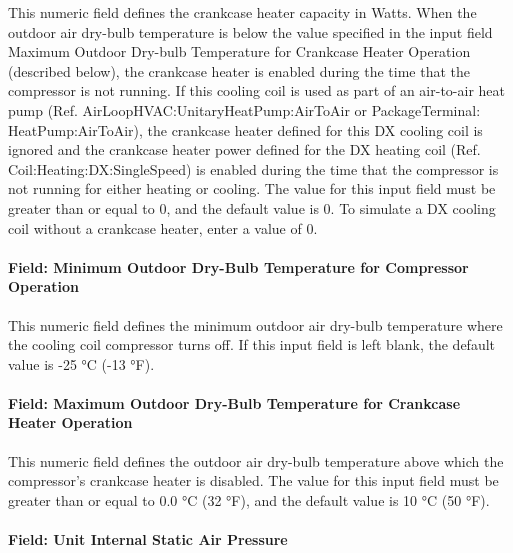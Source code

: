 This numeric field defines the crankcase heater capacity in Watts. When the outdoor air dry-bulb temperature is below the value specified in the input field Maximum Outdoor Dry-bulb Temperature for Crankcase Heater Operation (described below), the crankcase heater is enabled during the time that the compressor is not running. If this cooling coil is used as part of an air-to-air heat pump (Ref. AirLoopHVAC:UnitaryHeatPump:AirToAir or PackageTerminal: HeatPump:AirToAir), the crankcase heater defined for this DX cooling coil is ignored and the crankcase heater power defined for the DX heating coil (Ref. Coil:Heating:DX:SingleSpeed) is enabled during the time that the compressor is not running for either heating or cooling. The value for this input field must be greater than or equal to 0, and the default value is 0. To simulate a DX cooling coil without a crankcase heater, enter a value of 0.

\paragraph{Field: Minimum Outdoor Dry-Bulb Temperature for Compressor Operation}

This numeric field defines the minimum outdoor air dry-bulb temperature where the cooling coil compressor turns off. If this input field is left blank, the default value is -25 °C (-13 °F).

\paragraph{Field: Maximum Outdoor Dry-Bulb Temperature for Crankcase Heater Operation}

This numeric field defines the outdoor air dry-bulb temperature above which the compressor's crankcase heater is disabled. The value for this input field must be greater than or equal to 0.0 °C (32 °F), and the default value is 10 °C (50 °F).

\paragraph{Field: Unit Internal Static Air Pressure}

